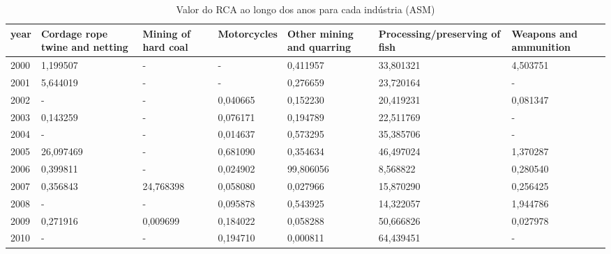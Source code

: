 \begin{table}
\centering
\caption{Valor do RCA ao longo dos anos para cada indústria (ASM)}
\begin{tabular}{p{1cm}p{2cm}p{2cm}p{2cm}p{2cm}p{2cm}p{2cm}}
\toprule
 year &  Cordage rope twine and netting &  Mining of hard coal &  Motorcycles &  Other mining and quarring &  Processing/preserving of fish &  Weapons and ammunition \\
\midrule
 2000 &                        1,199507 &                    - &            - &                   0,411957 &                      33,801321 &                4,503751 \\
 2001 &                        5,644019 &                    - &            - &                   0,276659 &                      23,720164 &                       - \\
 2002 &                               - &                    - &     0,040665 &                   0,152230 &                      20,419231 &                0,081347 \\
 2003 &                        0,143259 &                    - &     0,076171 &                   0,194789 &                      22,511769 &                       - \\
 2004 &                               - &                    - &     0,014637 &                   0,573295 &                      35,385706 &                       - \\
 2005 &                       26,097469 &                    - &     0,681090 &                   0,354634 &                      46,497024 &                1,370287 \\
 2006 &                        0,399811 &                    - &     0,024902 &                  99,806056 &                       8,568822 &                0,280540 \\
 2007 &                        0,356843 &            24,768398 &     0,058080 &                   0,027966 &                      15,870290 &                0,256425 \\
 2008 &                               - &                    - &     0,095878 &                   0,543925 &                      14,322057 &                1,944786 \\
 2009 &                        0,271916 &             0,009699 &     0,184022 &                   0,058288 &                      50,666826 &                0,027978 \\
 2010 &                               - &                    - &     0,194710 &                   0,000811 &                      64,439451 &                       - \\

\end{tabular}
\end{table}

